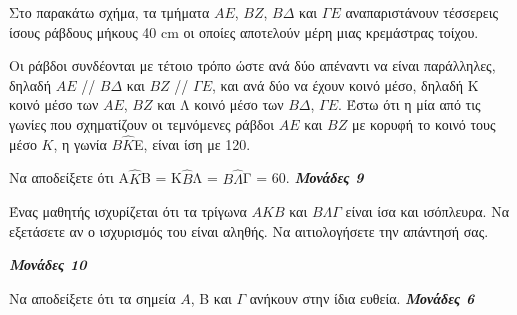 \documentclass[11pt,a4paper,twoside]{book}
\newcommand{\monades}[1]{
\hspace*{\fill}
\textbf{\textit{\textcolor{maincolor}{Μονάδες #1}}}}
\begin{document}
Στο παρακάτω σχήμα, τα τμήματα $AE$, $BZ$, $B\varDelta  $ και $\varGamma  E$ αναπαριστάνουν τέσσερεις ίσους ράβδους μήκους 40 cm οι οποίες αποτελούν μέρη μιας κρεμάστρας τοίχου.

Οι ράβδοι συνδέονται με τέτοιο τρόπο ώστε ανά δύο απέναντι να είναι παράλληλες, δηλαδή $AE$ // $B\varDelta  $ και $BZ$ // $\varGamma  E$, και ανά δύο να έχουν κοινό μέσο, δηλαδή Κ κοινό μέσο των $AE$, $BZ$ και Λ κοινό μέσο των $B\varDelta  $, $\varGamma  E$. Έστω ότι η μία από τις γωνίες που σχηματίζουν οι τεμνόμενες ράβδοι $AE$ και $BZ$ με κορυφή το κοινό τους μέσο $K$, η γωνία $B\hat{Κ}$Ε, είναι ίση με 120\degree.

\begin{alist}
\item Να αποδείξετε ότι Α$\hat{Κ}$Β = Κ$\hat{B}$Λ = $B\hat{\Lambda}$Γ = 60\degree. \monades{9}

\item Ένας μαθητής ισχυρίζεται ότι τα τρίγωνα $AKB$ και $B\varLambda \varGamma $ είναι ίσα και ισόπλευρα. Να εξετάσετε αν ο ισχυρισμός του είναι αληθής. Να αιτιολογήσετε την απάντησή σας.

\monades{10}

\item Να αποδείξετε ότι τα σημεία $A$, Β και $\varGamma$ ανήκουν στην ίδια ευθεία. \monades{6}


\begin{center}
\end{center}
\end{alist}
\end{document}
